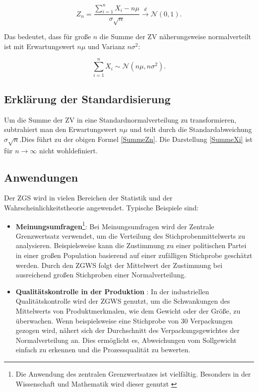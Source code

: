 \documentclass[a4paper, 12pt]{article}
\begin{document}
\begin{equation}
    Z_n = \frac{\sum_{i=1}^n X_i - n\mu}{\sigma\sqrt{n}} \xrightarrow{d} \mathcal{N}(0, 1). \label{SummeZn}
\end{equation}

Das bedeutet, dass für große \( n \) die Summe der ZV näherungsweise normalverteilt ist mit Erwartungswert \(n \mu\) und Varianz \(n \sigma^2\):

\begin{equation}
    \sum_{i=1}^n X_i \sim \mathcal{N}(n\mu, n\sigma^2).\label{SummeXi}
\end{equation}

\subsection{Erklärung der Standardisierung}
Um die Summe der ZV in eine Standardnormalverteilung zu transformieren, subtrahiert man den Erwartungswert \( n\mu \) und teilt durch die Standardabweichung \( \sigma\sqrt{n} \).Dies führt zu der obigen Formel \eqref{SummeZn}. Die Darstellung \eqref{SummeXi} ist für \(n \rightarrow \infty\)
nicht wohldefiniert.

\newpage

\subsection{Anwendungen}
Der ZGS wird in vielen Bereichen der Statistik und der Wahrscheinlichkeitstheorie angewendet. Typische Beispiele sind:

\begin{itemize}
    \item  \textbf{Meinungsumfragen}\footnote{Die Anwendung des zentralen Grenzwertsatzes ist vielfältig. Besonders in der Wissenschaft und Mathematik wird dieser genutzt \cite{3} \label{footnote2}}:
    Bei Meinungsumfragen wird der Zentrale Grenzwertsatz verwendet, um die Verteilung des Stichprobenmittelwerts zu analysieren. Beispielsweise kann die Zustimmung zu einer politischen Partei in einer großen Population basierend auf einer zufälligen Stichprobe geschätzt werden. Durch den ZGWS folgt der Mittelwert der Zustimmung bei ausreichend großen Stichproben einer Normalverteilung.
    \item \textbf{Qualitätskontrolle in der
    Produktion} \hyperlink{footnote.\getrefnumber{footnote2}}{\textsuperscript{}}:
    In der industriellen Qualitätskontrolle wird der ZGWS genutzt, um die Schwankungen des Mittelwerts von Produktmerkmalen, wie dem Gewicht oder der Größe, zu überwachen. Wenn beispielsweise eine Stichprobe von 30 Verpackungen gezogen wird, nähert sich der Durchschnitt des Verpackungsgewichtes der Normalverteilung an. Dies ermöglicht es, Abweichungen vom Sollgewicht einfach zu erkennen und die Prozessqualität zu bewerten.
\end{itemize}
\end{document}
